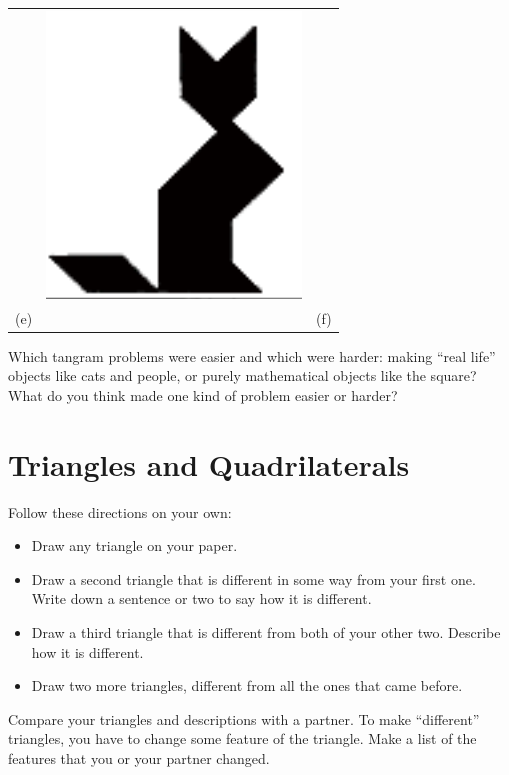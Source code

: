 \begin{problem}
\begin{center}
\begin{tabular}{ccc}
\qquad \qquad\qquad& 
\includegraphics[scale=0.7]{tangram6}\\
(e) && (f)\\
\end{tabular}
\end{center}
\end{problem}

\bigskip

\begin{thinkpair*}
Which tangram problems were easier and which were harder: making ``real life'' objects like cats and people, or purely mathematical objects like the square?  What do you think made one kind of problem easier or harder?
\end{thinkpair*}

\newpage

\section{Triangles and Quadrilaterals}


\begin{thinkpair*}
Follow these directions on your own:
\begin{itemize}
\item
Draw any triangle on your paper.\\
\item
Draw a second triangle that is different in some way from your first one. Write down a sentence or two to say how it is different.\\
\item
Draw a third triangle that is different from both of your other two. Describe how it is different.\\
\item
Draw two more triangles, different from all the ones that came before.

\end{itemize}
Compare your triangles and descriptions with a partner.
To make ``different'' triangles, you have to change some feature of the triangle. Make a list of the features  that 
you or your partner changed.

\end{thinkpair*}

